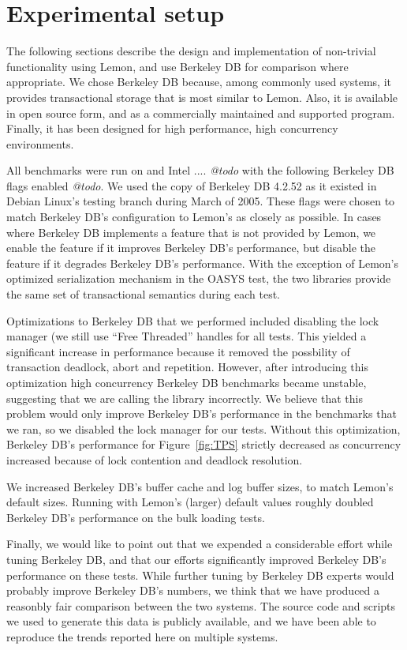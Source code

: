 \documentclass[letterpaper,twocolumn,english]{article}
\newcommand{\yad}{Lemon\xspace}
\begin{document}
\section{Experimental setup}

The following sections describe the design and implementation of
non-trivial functionality using \yad, and use Berkeley DB for
comparison where appropriate.  We chose Berkeley DB because, among
commonly used systems, it provides transactional storage that is most
similar to \yad.  Also, it is available in open source form, and as a
commercially maintained and supported program.  Finally, it has been 
designed for high performance, high concurrency environments.

All benchmarks were run on and Intel .... {\em @todo} with the
following Berkeley DB flags enabled {\em @todo}.  We used the copy
of Berkeley DB 4.2.52 as it existed in Debian Linux's testing
branch during March of 2005.  These flags were chosen to match 
Berkeley DB's configuration to \yad's as closely as possible.  In cases where
Berkeley DB implements a feature that is not provided by \yad, we
enable the feature if it improves Berkeley DB's performance, but
disable the feature if it degrades Berkeley DB's performance.  With 
the exception of \yad's optimized serialization mechanism in the 
OASYS test, the two libraries provide the same set of transactional 
semantics during each test.  

Optimizations to Berkeley DB that we performed included disabling the
lock manager (we still use ``Free Threaded'' handles for all tests.
This yielded a significant increase in performance because it removed
the possbility of transaction deadlock, abort and repetition.
However, after introducing this optimization high concurrency Berkeley
DB benchmarks became unstable, suggesting that we are calling the
library incorrectly.  We believe that this problem would only improve
Berkeley DB's performance in the benchmarks that we ran, so we
disabled the lock manager for our tests.  Without this optimization,
Berkeley DB's performance for Figure~\ref{fig:TPS} strictly decreased as
concurrency increased because of lock contention and deadlock resolution.

We increased Berkeley DB's buffer cache and log buffer sizes, to match
\yad's default sizes.  Running with \yad's (larger) default values
roughly doubled Berkeley DB's performance on the bulk loading tests.

Finally, we would like to point out that we expended a considerable
effort while tuning Berkeley DB, and that our efforts significantly
improved Berkeley DB's performance on these tests.  While further
tuning by Berkeley DB experts would probably improve Berkeley DB's
numbers, we think that we have produced a reasonbly fair comparison
between the two systems.  The source code and scripts we used to
generate this data is publicly available, and we have been able to
reproduce the trends reported here on multiple systems.
\end{document}
